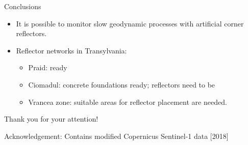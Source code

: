 \documentclass{beamer}
\begin{document}
\begin{frame}{Conclusions}
    \begin{itemize}
        \item It is possible to monitor slow geodynamic processes with artificial corner reflectors.
        \item Reflector networks in Transylvania:
        \begin{itemize}
            \item Praid: ready
            \item Ciomadul: concrete foundations ready; reflectors need to be 
            \item Vrancea zone: suitable areas for reflector placement are needed.
        \end{itemize}
    \end{itemize}
\end{frame}


\begin{frame}
    \begin{center}
        \Huge \color{blue!55!black}
        Thank you for your attention!
    \end{center}
    \vspace{35pt}
    {\large
    Acknowledgement: Contains modified Copernicus Sentinel-1 data [2018]
    }
\end{frame}
\end{document}

